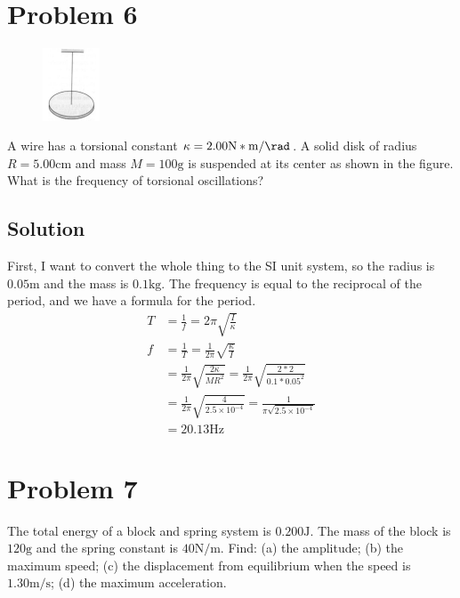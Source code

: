 \documentclass[12pt]{article}
\begin{document}
\pagebreak
\section{Problem 6}
\begin{figure}
    \vspace{-30pt}
    \includegraphics[width=0.15\textwidth]{graph_6.png} 
\end{figure}
A wire has a torsional constant $\kappa = 2.00 \unit{\newton*\meter/\rad}$. A solid disk of radius $R = 5.00 \unit{\centi\meter}$ and mass $M = 100 \unit{\gram}$ is suspended at its center as shown in the figure. What is the frequency of torsional oscillations?

\subsection{Solution}
First, I want to convert the whole thing to the SI unit system, so the radius is $0.05 \unit{\meter}$ and the mass is $0.1 \unit{\kilo\gram}$. The frequency is equal to the reciprocal of the period, and we have a formula for the period.
\begin{align}
    T   &=  \frac{1}{f}
        =   2\pi\sqrt{\frac{I}{\kappa}}\\
    f   &=  \frac{1}{T}
        =   \frac{1}{2\pi}\sqrt{\frac{\kappa}{I}}\\
        &=  \frac{1}{2\pi}\sqrt{\frac{2\kappa}{MR^2}}
        =   \frac{1}{2\pi}\sqrt{\frac{2*2}{0.1*0.05^2}}\\
        &=  \frac{1}{2\pi}\sqrt{\frac{4}{2.5\times10^{-4}}}
        =   \frac{1}{\pi\sqrt{2.5\times10^{-4}}}\\
        &=  \boxed{20.13 \unit{\hertz}}
\end{align}

\pagebreak
\section{Problem 7}
The total energy of a block and spring system is $0.200 \unit{\joule}$. The mass of the block is $120 \unit{\gram}$ and the spring constant is $40 \unit{\newton/\meter}$. Find: (a) the amplitude; (b) the maximum speed; (c) the displacement from equilibrium when the speed is $1.30 \unit{\meter/\second}$; (d) the maximum acceleration.
\end{document}
